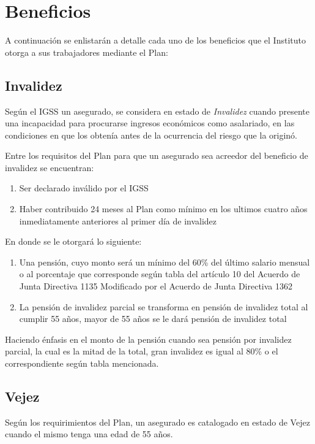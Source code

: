 \documentclass[12pt,letterpaper,titlepage]{article}
\begin{document}
\section{Beneficios}

A continuación se enlistarán a detalle cada uno de los beneficios que el Instituto otorga a sus trabajadores mediante el Plan:

\subsection{Invalidez}

Según el IGSS un asegurado, se considera en estado de \textit{Invalidez} cuando presente una incapacidad para procurarse ingresos económicos como asalariado, en las condiciones en que los obtenía antes de la ocurrencia del riesgo que la originó. 

Entre los requisitos del Plan para que un asegurado sea acreedor del beneficio de invalidez se encuentran:
\begin{enumerate}
	\item Ser declarado inválido por el IGSS
	\item Haber contribuido 24 meses al Plan como mínimo en los ultimos cuatro años inmediatamente anteriores al primer día de invalidez
\end{enumerate}

En donde se le otorgará lo siguiente:
\begin{enumerate}
	\item Una pensión, cuyo monto será un mínimo del 60\% del último salario mensual o al porcentaje que corresponde según tabla del artículo 10 del Acuerdo de Junta Directiva 1135 Modificado por el Acuerdo de Junta Directiva 1362 
	\item La pensión de invalidez parcial se transforma en pensión de invalidez total al cumplir 55 años, mayor de 55 años se le dará pensión de invalidez total
\end{enumerate}

Haciendo énfasis en el monto de la pensión cuando sea pensión por invalidez parcial, la cual es la mitad de la total, gran invalidez es igual al 80\% o el correspondiente según tabla mencionada.

\subsection{Vejez}

Según los requirimientos del Plan, un asegurado es catalogado en estado de Vejez cuando el mismo tenga una edad de 55 años.
\end{document}
